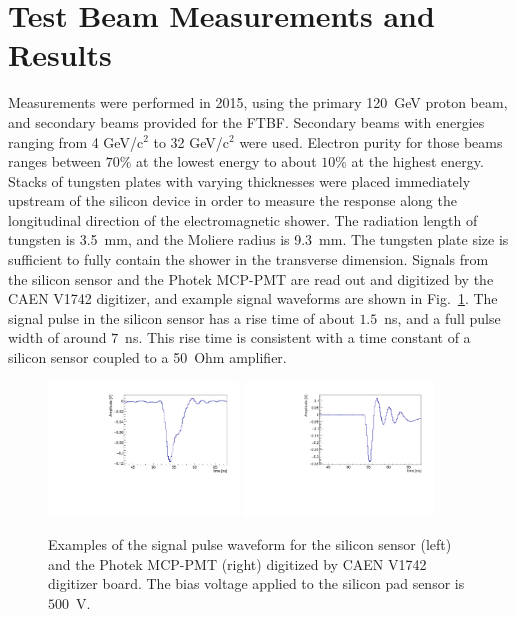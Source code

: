 \documentclass[preprint,1p]{elsarticle}
\begin{document}
\section{Test Beam Measurements and Results} 
\label{sec:results} 

Measurements were performed in 2015, using the primary 120~GeV proton beam, and secondary
beams provided for the FTBF. Secondary beams with energies ranging from 4
GeV/c$^2$ to 32 GeV/c$^2$ were used. Electron purity for those beams ranges
between $70\%$ at the lowest energy to about $10\%$ at the highest energy.
Stacks of tungsten plates with varying thicknesses were placed immediately
upstream of the silicon device in order to measure the response along the
longitudinal direction of the electromagnetic shower. The radiation length of
tungsten is 3.5~mm, and the Moliere radius is 9.3~mm. The tungsten plate size is
sufficient to fully contain the shower in the transverse dimension. Signals from
the silicon sensor and the Photek MCP-PMT are read out and digitized by the CAEN
V1742 digitizer, and example signal waveforms are shown in
Fig.~\ref{fig:pulses}. The signal pulse in the silicon sensor has a rise time of
about $1.5$~ns, and a full pulse width of around $7$~ns. This rise time is
consistent with a time constant of a silicon sensor coupled to a 50~Ohm amplifier.

\begin{figure}[htbp] 
\centering
\includegraphics[width=0.45\textwidth]{plots/ExampleSiliconPadPulse_6X0_16GeV.pdf} 
\includegraphics[width=0.45\textwidth]{plots/ExamplePhotekPulse.pdf} 
\caption{Examples of the signal pulse waveform for the silicon sensor (left) and
the Photek MCP-PMT (right) digitized by CAEN V1742 digitizer board. The bias
voltage applied to the silicon pad sensor is~$500$~V.} 
\label{fig:pulses} 
\end{figure} 
\end{document}
